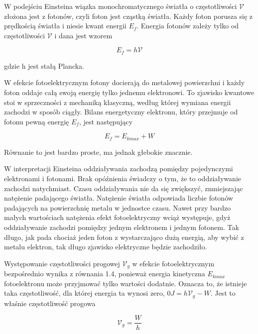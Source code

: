 \documentclass[12pt, a4paper, notitlepage]{report}
\begin{document}
	W podejściu Einsteina wiązka monochromatycznego światła o częstotliwości
	$\mathcal{V}$ złożona jest z fotonów, czyli foton jest cząstką światła. Każdy
	foton porusza się z prędkością światła i niesie kwant energii $E_{f}$. Energia
	fotonów zależy tylko od częstotliwości $\mathcal{V}$ i dana jest wzorem

	\begin{equation}
		E_{f}=h \mathcal{V}
	\end{equation}

	gdzie h jest stałą Plancka.

	W efekcie fotoelektrycznym fotony docierają do metalowej powierzchni i każdy foton
	oddaje całą swoją energię tylko jednemu elektronowi. To zjawisko kwantowe stoi
	w sprzeczności z mechaniką klasyczną, według której wymiana energii zachodzi w
	sposób ciągły. Bilans energetyczny elektronu, który przejmuje od fotonu pewną energię
	$E_{f}$, jest następujący

	\begin{equation}
		E_{f}=E_{kmax}+W
	\end{equation}

	Równanie to jest bardzo proste, ma jednak głebokie znacznie.

	W interpretacji Einsteina oddziaływania zachodzą pomiędzy pojedynczymi elektronami
	i fotonami. Brak opóźnienia świadczy o tym, że to oddziaływanie zachodzi natychmiast.
	Czasu oddziaływania nie da się zwiększyć, zmniejszając natężenie padającego światła.
	Natężenie światła odpowiada liczbie fotonów padających na powierzchnię metalu
	w jednostce czasu. Nawet przy bardzo małych wartościach natężenia efekt fotoelektryczny
	wciąż występuje, gdyż oddziaływanie zachodzi pomiędzy jednym elektronem i
	jednym fotonem. Tak długo, jak pada chociaż jeden foton z wystarczająco dużą
	energią, aby wybić z metalu elektron, tak długo zjawisko elektryczne będzie
	zachodziło.

	Występowanie częstotliwości progowej $\mathcal{V}_{g}$ w efekcie
	fotoelektrycznym bezpośrednio wynika z równania 1.4, ponieważ energia kinetyczna
	$E_{kmax}$ fotoelektronu może przyjmować tylko wartości dodatnie. Oznacza to, że
	istnieje taka częstotliwość, dla której energia ta wynosi zero, $0J=h\mathcal{V}
	_{g} -W$. Jest to właśnie częstotliwość progowa

	\begin{equation}
		\mathcal{V}_{g} =\frac{W}{h}
	\end{equation}
\end{document}
